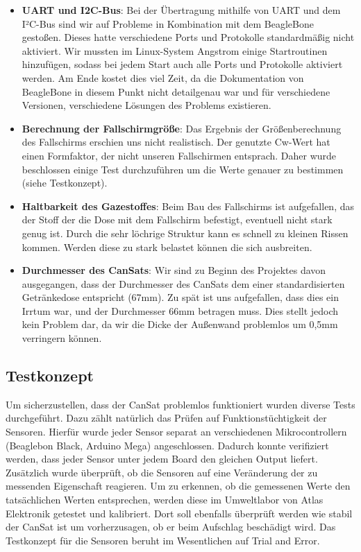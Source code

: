 \begin{itemize}
	\item \textbf{UART und I2C-Bus}: Bei der Übertragung mithilfe von UART und dem I²C-Bus sind wir auf Probleme in Kombination mit dem BeagleBone gestoßen. Dieses hatte verschiedene Ports und Protokolle standardmäßig nicht aktiviert. Wir mussten im Linux-System Angstrom einige Startroutinen hinzufügen, sodass bei jedem Start auch alle Ports und Protokolle aktiviert werden. Am Ende kostet dies viel Zeit, da die Dokumentation von BeagleBone in diesem Punkt nicht detailgenau war und für verschiedene Versionen, verschiedene Lösungen des Problems existieren.
\item \textbf{Berechnung der Fallschirmgröße}: Das Ergebnis der Größenberechnung des Fallschirms erschien uns nicht realistisch. Der genutzte Cw-Wert hat einen Formfaktor, der nicht unseren Fallschirmen entsprach. Daher wurde beschlossen einige Test durchzuführen um die Werte genauer zu bestimmen (siehe Testkonzept).
\item \textbf{Haltbarkeit des Gazestoffes}: Beim Bau des Fallschirms ist aufgefallen, das der Stoff der die Dose mit dem Fallschirm befestigt, eventuell nicht stark genug ist. Durch die sehr löchrige Struktur kann es schnell zu kleinen Rissen kommen. Werden diese zu stark belastet können die sich ausbreiten.
\item \textbf{Durchmesser des CanSats}: Wir sind zu Beginn des Projektes davon ausgegangen, dass der Durchmesser des CanSats dem einer standardisierten Getränkedose entspricht (67mm). Zu spät ist uns aufgefallen, dass dies ein Irrtum war, und der Durchmesser 66mm betragen muss. Dies stellt jedoch kein Problem dar, da wir die Dicke der Außenwand problemlos um 0,5mm verringern können.
\end{itemize}

\subsection{Testkonzept}

Um sicherzustellen, dass der CanSat problemlos funktioniert wurden diverse Tests durchgeführt. Dazu zählt natürlich das Prüfen auf Funktionstüchtigkeit der Sensoren. Hierfür wurde jeder Sensor separat an verschiedenen Mikrocontrollern (Beaglebon Black, Arduino Mega) angeschlossen. Dadurch konnte verifiziert werden, dass jeder Sensor unter jedem Board den gleichen Output liefert. Zusätzlich wurde überprüft, ob die Sensoren auf eine Veränderung der zu messenden Eigenschaft reagieren. Um zu erkennen, ob die gemessenen Werte den tatsächlichen Werten entsprechen, werden diese im Umweltlabor von Atlas Elektronik getestet und kalibriert. Dort soll ebenfalls überprüft werden wie stabil der CanSat ist um vorherzusagen, ob er beim Aufschlag beschädigt wird. Das Testkonzept für die Sensoren beruht im Wesentlichen auf Trial and Error.

